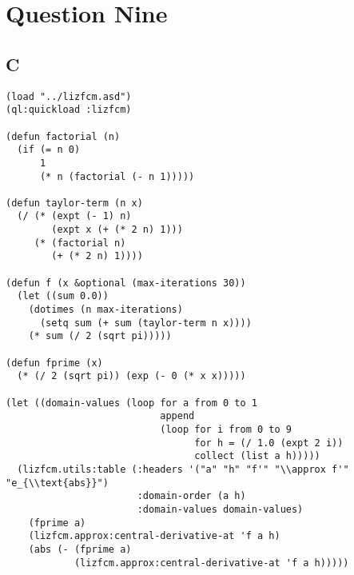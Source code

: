 \documentclass[11pt]{article}
\begin{document}
\section{Question Nine}
\label{sec:orgeb1839f}
\subsection{C}
\label{sec:org5691277}

\begin{verbatim}
(load "../lizfcm.asd")
(ql:quickload :lizfcm)

(defun factorial (n)
  (if (= n 0)
      1
      (* n (factorial (- n 1)))))

(defun taylor-term (n x)
  (/ (* (expt (- 1) n)
        (expt x (+ (* 2 n) 1)))
     (* (factorial n)
        (+ (* 2 n) 1))))

(defun f (x &optional (max-iterations 30))
  (let ((sum 0.0))
    (dotimes (n max-iterations)
      (setq sum (+ sum (taylor-term n x))))
    (* sum (/ 2 (sqrt pi)))))

(defun fprime (x)
  (* (/ 2 (sqrt pi)) (exp (- 0 (* x x)))))

(let ((domain-values (loop for a from 0 to 1
                           append 
                           (loop for i from 0 to 9
                                 for h = (/ 1.0 (expt 2 i))
                                 collect (list a h)))))
  (lizfcm.utils:table (:headers '("a" "h" "f'" "\\approx f'" "e_{\\text{abs}}")
                       :domain-order (a h)
                       :domain-values domain-values)
    (fprime a)
    (lizfcm.approx:central-derivative-at 'f a h)
    (abs (- (fprime a)
            (lizfcm.approx:central-derivative-at 'f a h)))))
\end{verbatim}
\end{document}
